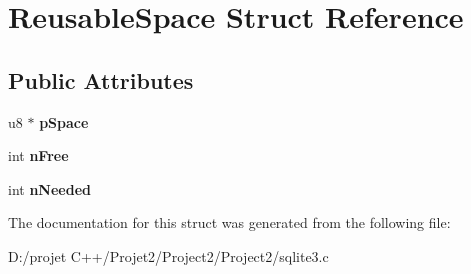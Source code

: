 \hypertarget{struct_reusable_space}{}\section{Reusable\+Space Struct Reference}
\label{struct_reusable_space}
\subsection*{Public Attributes}
\begin{DoxyCompactItemize}
\item 
\mbox{\label{struct_reusable_space_a457bb011e90fd7c4eb61c79925720981}} 
u8 $\ast$ {\bfseries p\+Space}
\item 
\mbox{\label{struct_reusable_space_a0be5d91e907e20632e3f508e34fb7989}} 
int {\bfseries n\+Free}
\item 
\mbox{\label{struct_reusable_space_ac67d036d43ab721121af005f5ce88199}} 
int {\bfseries n\+Needed}
\end{DoxyCompactItemize}


The documentation for this struct was generated from the following file\+:\begin{DoxyCompactItemize}
\item 
D\+:/projet C++/\+Projet2/\+Project2/\+Project2/sqlite3.\+c\end{DoxyCompactItemize}
